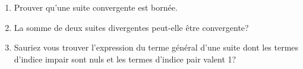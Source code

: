 \begin{exercice}

 \begin{enumerate}
  \item Prouver qu'une suite convergente est born\'ee.
  \item La somme de deux suites divergentes peut-elle \^etre
  convergente?
\item Sauriez vous trouver l'expression du terme g\'en\'eral d'une
  suite dont les termes d'indice impair sont nuls et les termes d'indice
  pair valent 1?
  \end{enumerate}
\end{exercice}

